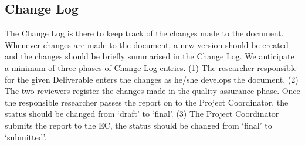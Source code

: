 \subsection{Change Log}
\label{sec:change-log}

The Change Log is there to keep track of the changes made to the document. Whenever changes are made to the document, a new version should be created and the changes should be briefly summarised in the Change Log. We anticipate a minimum of three phases of Change Log entries. (1) The researcher responsible for the given Deliverable enters the changes as he/she develops the document. (2) The two reviewers register the changes made in the quality assurance phase. Once the responsible researcher passes the report on to the Project Coordinator, the status should be changed from ‘draft’ to ‘final’. (3) The Project Coordinator submits the report to the EC, the status should be changed from ‘final’ to ‘submitted’.

